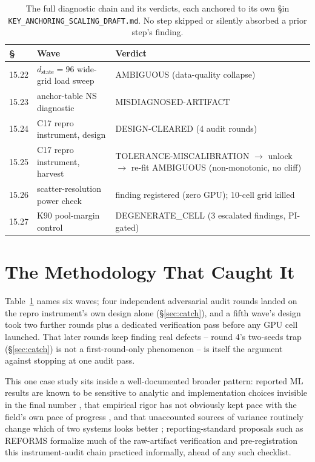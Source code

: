 \documentclass[10pt,letterpaper]{article}
\newcommand{\dstate}{d_{\mathrm{state}}}
\begin{document}
\begin{table}[t]
\centering
\footnotesize
\renewcommand{\arraystretch}{0.95}
\begin{tabular}{@{}p{0.6cm}p{3.3cm}p{3.6cm}@{}}
\toprule
\S & Wave & Verdict \\
\midrule
15.22 & $\dstate{=}96$ wide-grid load sweep & AMBIGUOUS (data-quality collapse) \\
15.23 & anchor-table NS diagnostic & MISDIAGNOSED-ARTIFACT \\
15.24 & C17 repro instrument, design & DESIGN-CLEARED (4 audit rounds) \\
15.25 & C17 repro instrument, harvest & TOLERANCE-MISCALIBRATION $\to$ unlock $\to$ re-fit AMBIGUOUS (non-monotonic, no cliff) \\
15.26 & scatter-resolution power check & finding registered (zero GPU); 10-cell grid killed \\
15.27 & K90 pool-margin control & DEGENERATE\_CELL (3 escalated findings, PI-gated) \\
\bottomrule
\end{tabular}
\caption{The full diagnostic chain and its verdicts, each anchored to its
own \S in \texttt{KEY\_ANCHORING\_SCALING\_DRAFT.md}. No step skipped or
silently absorbed a prior step's finding.}
\label{tab:chain}
\end{table}

\section{The Methodology That Caught It}
\label{sec:methodology}

Table~\ref{tab:chain} names six waves; four independent adversarial audit
rounds landed on the repro instrument's own design alone
(\S\ref{sec:catch}), and a fifth wave's design took two further rounds
plus a dedicated verification pass before any GPU cell launched.
That later rounds keep finding real defects -- round 4's two-seeds trap
(\S\ref{sec:catch}) is not a first-round-only phenomenon -- is itself the
argument against stopping at one audit pass.

This one case study sits inside a well-documented broader pattern:
reported ML results are known to be sensitive to analytic and
implementation choices invisible in the final number
\citep{silberzahn2018many, damour2020underspecification}, that empirical
rigor has not obviously kept pace with the field's own pace of progress
\citep{sculley2018winners, lipton2018troubling}, and that unaccounted
sources of variance routinely change which of two systems looks better
\citep{henderson2018deep, bouthillier2021accounting}; reporting-standard
proposals such as REFORMS \citep{kapoor2023reforms} formalize much of the
raw-artifact verification and pre-registration this instrument-audit
chain practiced informally, ahead of any such checklist.
\end{document}
